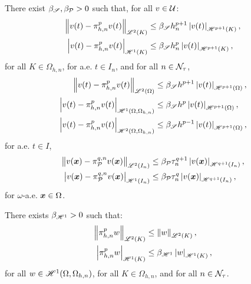 \begin{lemma} %
    There exist $\beta_{\mathscr{S}}, \beta_{\mathcal{P}_{}} > 0$ such that, for all $v \in \mathcal{U}$:
    \begin{align}
        \left\lVert v(t) - \pi_{h, n}^p v(t) \right\rVert_{\mathscr{L}^{2}(K)} &\leq \beta_{\mathscr{S}} h_n^{p + 1} \left\lvert v(t) \right\rvert_{\mathscr{H}^{p + 1}(K)}, \\
        \left\lvert v(t) - \pi_{h, n}^p v(t) \right\rvert_{\mathscr{H}^{1}(K)} &\leq \beta_{\mathscr{S}} h_n^{p} \left\lvert v(t) \right\rvert_{\mathscr{H}^{p + 1}(K)},
    \end{align}
    for all $K \in \Omega_{h, n}$, for a.e. $t \in I_n$, and for all $n \in \mathcal{N}_{\tau}$,
    \begin{align}
        \left\lVert v(t) - \pi_{h, n}^p v(t) \right\rVert_{\mathscr{L}^{2}(\Omega)} &\leq \beta_{\mathscr{S}} h^{p + 1} \left\lvert v(t) \right\rvert_{\mathscr{H}^{p + 1}(\Omega)}, \\
        \left\lvert v(t) - \pi_{h, n}^p v(t) \right\rvert_{\mathscr{H}^{1}(\Omega, \Omega_{h, n})} &\leq \beta_{\mathscr{S}} h^{p} \left\lvert v(t) \right\rvert_{\mathscr{H}^{p + 1}(\Omega)}, \\
        \left\lvert v(t) - \pi_{h, n}^p v(t) \right\rvert_{\mathscr{H}^{2}(\Omega, \Omega_{h, n})} &\leq \beta_{\mathscr{S}} h^{p - 1} \left\lvert v(t) \right\rvert_{\mathscr{H}^{p + 1}(\Omega)},
    \end{align}
    for a.e. $t \in I$,
    \begin{align}
        \left\lVert v(\bm{x}) - \pi_{\mathcal{P}_{}}^{q, n} v(\bm{x}) \right\rVert_{\mathscr{L}^{2}(I_n)} &\leq \beta_{\mathcal{P}_{}} \tau_n^{q + 1} \left\lvert v(\bm{x}) \right\rvert_{\mathscr{H}^{q + 1}(I_n)}, \\
        \left\lvert v(\bm{x}) - \pi_{\mathcal{P}_{}}^{q, n} v(\bm{x}) \right\rvert_{\mathscr{H}^{1}(I_n)} &\leq \beta_{\mathcal{P}_{}} \tau_n^{q} \left\lvert v(\bm{x}) \right\rvert_{\mathscr{H}^{q + 1}(I_n)},
    \end{align}
    for $\omega$-a.e. $\bm{x} \in \Omega$.
\end{lemma}

\begin{lemma}
    There exists $\beta_{\mathscr{H}^{1}} > 0$ such that:
    \begin{align}
        \left\lVert \pi_{h, n}^p w \right\rVert_{\mathscr{L}^{2}(K)} &\leq \left\lVert w \right\rVert_{\mathscr{L}^{2}(K)}, \\
        \left\lvert \pi_{h, n}^p w \right\rvert_{\mathscr{H}^{1}(K)} &\leq \beta_{\mathscr{H}^{1}} \left\lvert w \right\rvert_{\mathscr{H}^{1}(K)},
    \end{align}
    for all $w \in \mathscr{H}^{1}(\Omega, \Omega_{h, n})$, for all $K \in \Omega_{h, n}$, and for all $n \in \mathcal{N}_{\tau}$.
\end{lemma}

